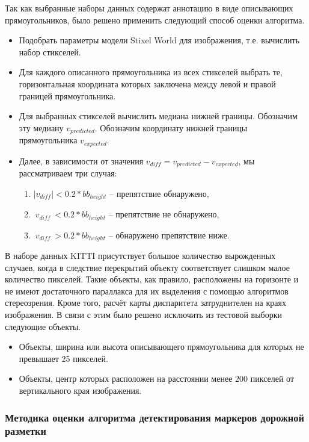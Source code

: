 \documentclass[aps,%
14pt,%
final,%
oneside,
onecolumn,%
musixtex, %
superscriptaddress,%
centertags]{extarticle} %
\begin{document}
Так как выбранные наборы данных содержат аннотацию в виде описывающих прямоугольников, было решено применить следующий способ оценки алгоритма. 
\begin{itemize}
\item Подобрать параметры модели Stixel World для изображения, т.е. вычислить набор стикселей.
\item Для каждого описанного прямоугольника из всех стикселей выбрать те, горизонтальная координата которых заключена между левой и правой границей прямоугольника.
\item Для выбранных стикселей вычислить медиана нижней границы. Обозначим эту медиану $v_{predicted}$. Обозначим координату нижней границы прямоугольника $v_{expected}$.
\item Далее, в зависимости от значения $v_{diff} = v_{predicted} - v_{expected}$, мы рассматриваем три случая:
\begin{enumerate}
\item $|v_{diff}|   < 0.2 * bb_{height}$    -- препятствие обнаружено,
\item $\ v_{diff}\  < 0.2 * bb_{height}$  -- препятствие не обнаружено,
\item $\ v_{diff}\  > 0.2 * bb_{height}$  -- обнаружено препятствие ниже.
\end{enumerate}
\end{itemize}

В наборе данных KITTI присутствует большое количество вырожденных случаев, когда в следствие перекрытий объекту соответствует слишком малое количество пикселей. Такие объекты, как правило, расположены на горизонте и не имеют достаточного параллакса для их выделения с помощью алгоритмов стереозрения. Кроме того, расчёт карты диспаритета затруднителен на краях изображения. В связи с этим было решено исключить из тестовой выборки следующие объекты.
\begin{itemize}
\item Объекты, ширина или высота описывающего прямоугольника для которых не превышает 25 пикселей.
\item Объекты, центр которых расположен на расстоянии менее 200 пикселей от вертикального края изображения.
\end{itemize}

\subsubsection{Методика оценки алгоритма детектирования маркеров дорожной разметки}
\end{document}
